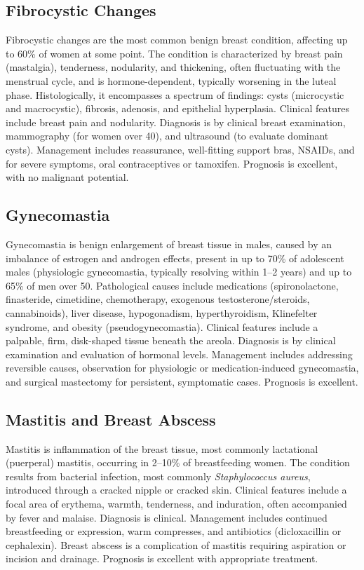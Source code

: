 \subsection{Fibrocystic Changes}
\label{sec:Fibrocystic Changes}
Fibrocystic changes are the most common benign breast condition, affecting up to 60\% of women at some point. The condition is characterized by breast pain (mastalgia), tenderness, nodularity, and thickening, often fluctuating with the menstrual cycle, and is hormone-dependent, typically worsening in the luteal phase. Histologically, it encompasses a spectrum of findings: cysts (microcystic and macrocystic), fibrosis, adenosis, and epithelial hyperplasia. Clinical features include breast pain and nodularity. Diagnosis is by clinical breast examination, mammography (for women over 40), and ultrasound (to evaluate dominant cysts). Management includes reassurance, well-fitting support bras, NSAIDs, and for severe symptoms, oral contraceptives or tamoxifen. Prognosis is excellent, with no malignant potential.

\subsection{Gynecomastia}
\label{sec:Gynecomastia}
Gynecomastia is benign enlargement of breast tissue in males, caused by an imbalance of estrogen and androgen effects, present in up to 70\% of adolescent males (physiologic gynecomastia, typically resolving within 1--2 years) and up to 65\% of men over 50. Pathological causes include medications (spironolactone, finasteride, cimetidine, chemotherapy, exogenous testosterone/steroids, cannabinoids), liver disease, hypogonadism, hyperthyroidism, Klinefelter syndrome, and obesity (pseudogynecomastia). Clinical features include a palpable, firm, disk-shaped tissue beneath the areola. Diagnosis is by clinical examination and evaluation of hormonal levels. Management includes addressing reversible causes, observation for physiologic or medication-induced gynecomastia, and surgical mastectomy for persistent, symptomatic cases. Prognosis is excellent.

\subsection{Mastitis and Breast Abscess}
\label{sec:Mastitis and Breast Abscess}
Mastitis is inflammation of the breast tissue, most commonly lactational (puerperal) mastitis, occurring in 2--10\% of breastfeeding women. The condition results from bacterial infection, most commonly \textit{Staphylococcus aureus}, introduced through a cracked nipple or cracked skin. Clinical features include a focal area of erythema, warmth, tenderness, and induration, often accompanied by fever and malaise. Diagnosis is clinical. Management includes continued breastfeeding or expression, warm compresses, and antibiotics (dicloxacillin or cephalexin). Breast abscess is a complication of mastitis requiring aspiration or incision and drainage. Prognosis is excellent with appropriate treatment.

